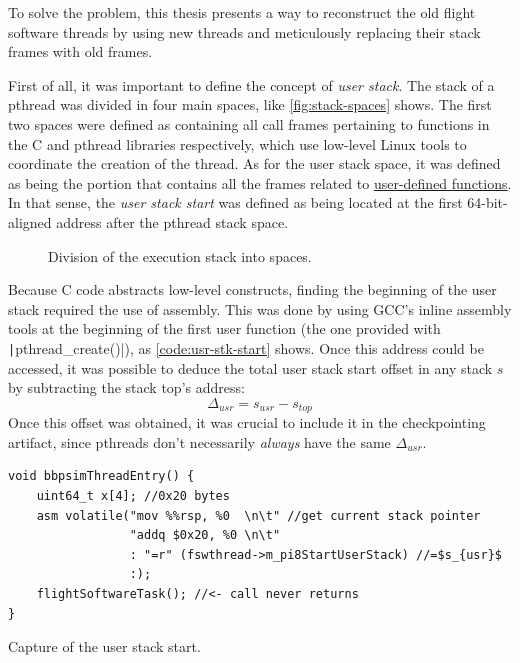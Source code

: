 To solve the problem, this thesis presents a way to reconstruct the old flight software threads by using new threads and meticulously replacing their stack frames with old frames. 

First of all, it was important to define the concept of \textit{user stack}. The stack of a pthread was divided in four main spaces, like \autoref{fig:stack-spaces} shows. The first two spaces were defined as containing all call frames pertaining to functions in the C and pthread libraries respectively, which use low-level Linux tools to coordinate the creation of the thread. As for the user stack space, it was defined as being the portion that contains all the frames related to \ul{user-defined functions}. In that sense, the \textit{user stack start} was defined as being located at the first 64-bit-aligned address after the pthread stack space. 
\begin{figure}[htbp]
	\centering 
	
	\caption{Division of the execution stack into spaces.}
	\label{fig:stack-spaces}
\end{figure}

Because C code abstracts low-level constructs, finding the beginning of the user stack required the use of assembly. This was done by using \gls{GCC}'s inline assembly tools at the beginning of the first user function (the one provided with \texttt|pthread_create()|), as \autoref{code:usr-stk-start} shows\cite{online:inline-asm}. Once this address could be accessed, it was possible to deduce the total user stack start offset in any stack $s$ by subtracting the stack top's address:
\[
	\Delta_{usr}=s_{usr}-s_{top}
\]
Once this offset was obtained, it was crucial to include it in the checkpointing artifact, since pthreads don't necessarily \textit{always} have the same $\Delta_{usr}$. 
\begin{listing}[htpb]
	\centering
	\begin{verbatim}
void bbpsimThreadEntry() {
	uint64_t x[4]; //0x20 bytes 
	asm volatile("mov %%rsp, %0  \n\t" //get current stack pointer
                 "addq $0x20, %0 \n\t" 
                 : "=r" (fswthread->m_pi8StartUserStack) //=$s_{usr}$
                 :);
	flightSoftwareTask(); //<- call never returns
}
	\end{verbatim}
	\caption{Capture of the user stack start.}
	\label{code:usr-stk-start}
\end{listing}

